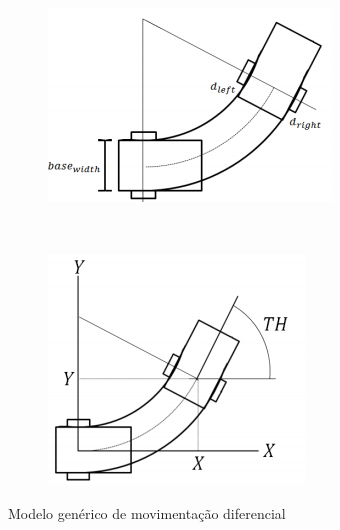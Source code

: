 \documentclass[
	12pt,				%
	openright,			%
	oneside,			%
	a4paper,			%
	english,			%
	french,				%
	spanish,			%
	brazil,				%
	]{abntex2}
\begin{document}
\begin{figure}[h!]
    \centering
    \begin{subfigure}[b]{0.4\textwidth}
        \includegraphics[width=\textwidth]{figs/dif_drive_1}
        \caption{}
        \label{fig:dif_drive_1}
    \end{subfigure}
    ~ %
    \begin{subfigure}[b]{0.4\textwidth}
        \includegraphics[width=\textwidth]{figs/dif_drive_2}
        \caption{}
        \label{fig:dif_drive_2}
    \end{subfigure}
    \caption{Modelo genérico de movimentação diferencial}\label{fig:dif_drive}
\end{figure}
\end{document}
